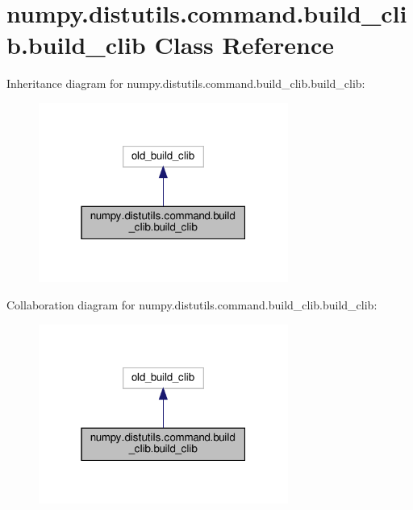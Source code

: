 \hypertarget{classnumpy_1_1distutils_1_1command_1_1build__clib_1_1build__clib}{}\section{numpy.\+distutils.\+command.\+build\+\_\+clib.\+build\+\_\+clib Class Reference}
\label{classnumpy_1_1distutils_1_1command_1_1build__clib_1_1build__clib}


Inheritance diagram for numpy.\+distutils.\+command.\+build\+\_\+clib.\+build\+\_\+clib\+:
\nopagebreak
\begin{figure}[H]
\begin{center}
\leavevmode
\includegraphics[width=232pt]{classnumpy_1_1distutils_1_1command_1_1build__clib_1_1build__clib__inherit__graph}
\end{center}
\end{figure}


Collaboration diagram for numpy.\+distutils.\+command.\+build\+\_\+clib.\+build\+\_\+clib\+:
\nopagebreak
\begin{figure}[H]
\begin{center}
\leavevmode
\includegraphics[width=232pt]{classnumpy_1_1distutils_1_1command_1_1build__clib_1_1build__clib__coll__graph}
\end{center}
\end{figure}

